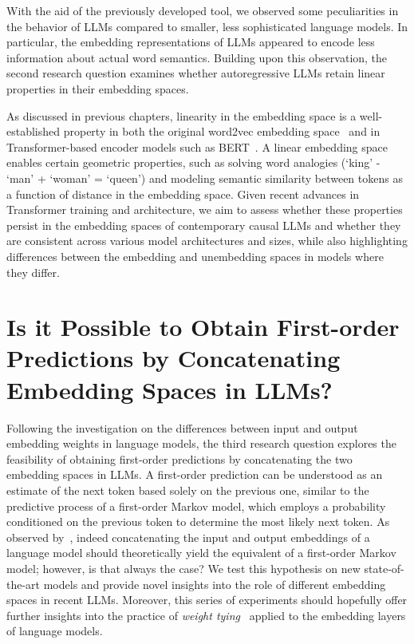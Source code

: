 With the aid of the previously developed tool, we observed some peculiarities in the behavior of LLMs compared to smaller, less sophisticated language models.
In particular, the embedding representations of LLMs appeared to encode less information about actual word semantics.
Building upon this observation, the second research question examines whether autoregressive LLMs retain linear properties in their embedding spaces.

As discussed in previous chapters, linearity in the embedding space is a well-established property in both the original word2vec embedding space~\cite{mikolov2013} and in Transformer-based encoder models such as BERT~\cite{devlin2019}.
A linear embedding space enables certain geometric properties, such as solving word analogies (`king' - `man' + `woman' = `queen') and modeling semantic similarity between tokens as a function of distance in the embedding space.
Given recent advances in Transformer training and architecture, we aim to assess whether these properties persist in the embedding spaces of contemporary causal LLMs and whether they are consistent across various model architectures and sizes, while also highlighting differences between the embedding and unembedding spaces in models where they differ.

\section{Is it Possible to Obtain First-order \texorpdfstring{ \\ }{} \mbox{Predictions} by \mbox{Concatenating} \texorpdfstring{ \\ }{} Embedding Spaces in LLMs?}\label{sec:rq_fom}

Following the investigation on the differences between input and output embedding weights in language models, the third research question explores the feasibility of obtaining first-order predictions by concatenating the two embedding spaces in LLMs.
A first-order prediction can be understood as an estimate of the next token based solely on the previous one, similar to the predictive process of a first-order Markov model, which employs a probability conditioned on the previous token to determine the most likely next token.
As observed by~\citet{elhage2021}, indeed concatenating the input and output embeddings of a language model should theoretically yield the equivalent of a first-order Markov model; however, is that always the case?
We test this hypothesis on new state-of-the-art models and provide novel insights into the role of different embedding spaces in recent LLMs.
Moreover, this series of experiments should hopefully offer further insights into the practice of \emph{weight tying}~\cite{inan2017,press2017} applied to the embedding layers of language models.
